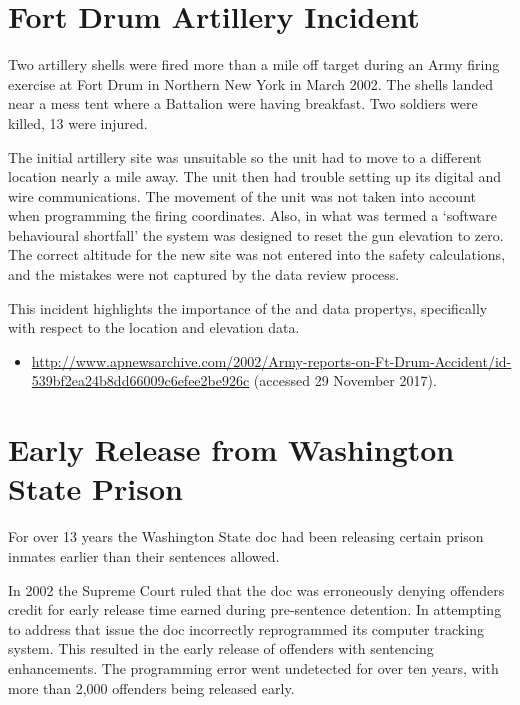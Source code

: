 \section{Fort Drum Artillery Incident} \label{bkm:incacc:fortdrum}
Two artillery shells were fired more than a mile off target during an Army firing exercise at Fort Drum in Northern New York in March 2002. The shells landed near a mess tent where a Battalion were having breakfast. Two soldiers were killed, 13 were injured. 

The initial artillery site was unsuitable so the unit had to move to a different location nearly a mile away. The unit then had trouble setting up its digital and wire communications. The movement of the unit was not taken into account when programming the firing coordinates. Also, in what was termed a `software behavioural shortfall' the system was designed to reset the gun elevation to zero. The correct altitude for the new site was not entered into the safety calculations, and the mistakes were not captured by the data review process.

This incident highlights the importance of the  and  \glspl{data property}, specifically with respect to the location and elevation data.

\begin{itemize}
	\item \raggedright{\href{http://www.apnewsarchive.com/2002/Army-reports-on-Ft-Drum-Accident/id-539bf2ea24b8dd66009c6efee2be926c}{http://www.apnewsarchive.com/2002/Army-reports-on-Ft-Drum-Accident/id- 539bf2ea24b8dd66009c6efee2be926c} (accessed 29 November 2017).}
\end{itemize}


\section{Early Release from Washington State Prison} \label{bkm:incacc:washprison}
For over 13 years the Washington State \gls{doc} had been releasing certain prison inmates earlier than their sentences allowed.

In 2002 the Supreme Court ruled that the \gls{doc} was erroneously denying offenders credit for early release time earned during pre-sentence detention. In attempting to address that issue the \gls{doc} incorrectly reprogrammed its computer tracking system. This resulted in the early release of offenders with sentencing enhancements. The programming error went undetected for over ten years, with more than 2,000 offenders being released early.

